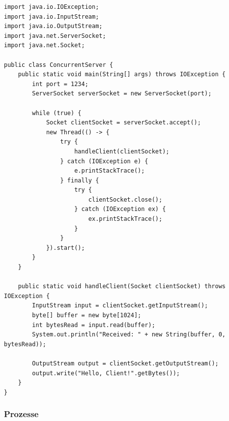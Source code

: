 \documentclass[../vs-script-first-v01.tex]{subfiles}
\begin{document}
\begin{lstlisting}[caption={Concurrent Server},captionpos=b,label={lst:concurrent}]
import java.io.IOException;
import java.io.InputStream;
import java.io.OutputStream;
import java.net.ServerSocket;
import java.net.Socket;

public class ConcurrentServer {
    public static void main(String[] args) throws IOException {
        int port = 1234;
        ServerSocket serverSocket = new ServerSocket(port);

        while (true) {
            Socket clientSocket = serverSocket.accept();
            new Thread(() -> {
                try {
                    handleClient(clientSocket);
                } catch (IOException e) {
                    e.printStackTrace();
                } finally {
                    try {
                        clientSocket.close();
                    } catch (IOException ex) {
                        ex.printStackTrace();
                    }
                }
            }).start();
        }
    }

    public static void handleClient(Socket clientSocket) throws IOException {
        InputStream input = clientSocket.getInputStream();
        byte[] buffer = new byte[1024];
        int bytesRead = input.read(buffer);
        System.out.println("Received: " + new String(buffer, 0, bytesRead));

        OutputStream output = clientSocket.getOutputStream();
        output.write("Hello, Client!".getBytes());
    }
}
\end{lstlisting}

\subsubsection{Prozesse}
\end{document}
